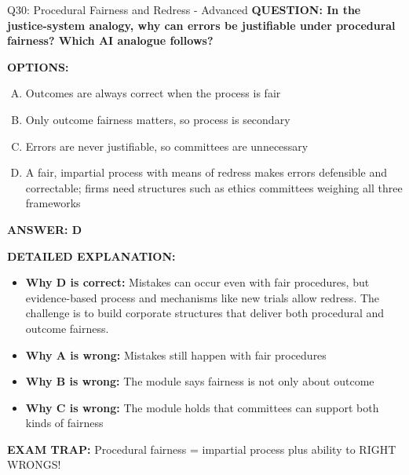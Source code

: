 \documentclass[8pt]{beamer}
\begin{document}
\begin{frame}[shrink=6]{Q30: Procedural Fairness and Redress - Advanced}
\fontsize{6.5}{7.5}\selectfont
\textbf{QUESTION: In the justice-system analogy, why can errors be justifiable under procedural fairness? Which AI analogue follows?}

\vspace{0.1cm}
\textbf{OPTIONS:}
\begin{enumerate}[A.]
\item Outcomes are always correct when the process is fair
\item Only outcome fairness matters, so process is secondary
\item Errors are never justifiable, so committees are unnecessary
\item A fair, impartial process with means of redress makes errors defensible and correctable; firms need structures such as ethics committees weighing all three frameworks
\end{enumerate}

\vspace{0.1cm}
\textcolor{myblue}{\textbf{ANSWER: D}}

\vspace{0.1cm}
\textbf{DETAILED EXPLANATION:}
\begin{itemize}
\item \textbf{Why D is correct:} Mistakes can occur even with fair procedures, but evidence-based process and mechanisms like new trials allow redress. The challenge is to build corporate structures that deliver both procedural and outcome fairness.
\item \textbf{Why A is wrong:} Mistakes still happen with fair procedures
\item \textbf{Why B is wrong:} The module says fairness is not only about outcome
\item \textbf{Why C is wrong:} The module holds that committees can support both kinds of fairness
\end{itemize}

\textcolor{myred}{\textbf{EXAM TRAP:}} Procedural fairness = impartial process plus ability to RIGHT WRONGS!
\end{frame}
\end{document}
